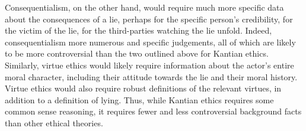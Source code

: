 \begin{isabellebody}
\begin{isamarkuptext}
Consequentialism, on the other hand, would require much more specific data about the consequences of 
a lie, perhaps for the specific person's credibility, for the victim of the lie, for the third-parties 
watching the lie unfold. Indeed, consequentialism more numerous and specific judgements, all of which are 
likely to be more controversial than the two outlined above for Kantian ethics. Similarly, virtue ethics
would likely require information about the actor's entire moral character, including their attitude
towards the lie and their moral history. Virtue ethics would also require robust definitions of the 
relevant virtues, in addition to a definition of lying. Thus, while Kantian ethics requires some 
common sense reasoning, it requires fewer and less controversial background facts than other ethical theories.


\end{isamarkuptext}
\end{isabellebody}
